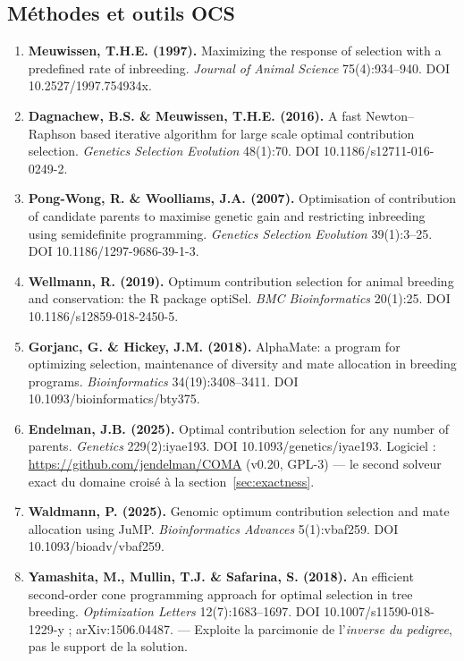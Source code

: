\documentclass[11pt]{article}
\begin{document}
\subsection*{Méthodes et outils OCS}
\begin{enumerate}
\item \textbf{Meuwissen, T.H.E. (1997).} Maximizing the response of selection with a predefined rate of inbreeding. \emph{Journal of Animal Science} 75(4):934--940. DOI 10.2527/1997.754934x.
\item \textbf{Dagnachew, B.S. \& Meuwissen, T.H.E. (2016).} A fast Newton--Raphson based iterative algorithm for large scale optimal contribution selection. \emph{Genetics Selection Evolution} 48(1):70. DOI 10.1186/s12711-016-0249-2.
\item \textbf{Pong-Wong, R. \& Woolliams, J.A. (2007).} Optimisation of contribution of candidate parents to maximise genetic gain and restricting inbreeding using semidefinite programming. \emph{Genetics Selection Evolution} 39(1):3--25. DOI 10.1186/1297-9686-39-1-3.
\item \textbf{Wellmann, R. (2019).} Optimum contribution selection for animal breeding and conservation: the R package optiSel. \emph{BMC Bioinformatics} 20(1):25. DOI 10.1186/s12859-018-2450-5.
\item \textbf{Gorjanc, G. \& Hickey, J.M. (2018).} AlphaMate: a program for optimizing selection, maintenance of diversity and mate allocation in breeding programs. \emph{Bioinformatics} 34(19):3408--3411. DOI 10.1093/bioinformatics/bty375.
\item \textbf{Endelman, J.B. (2025).} Optimal contribution selection for any number of parents. \emph{Genetics} 229(2):iyae193. DOI 10.1093/genetics/iyae193. Logiciel : \url{https://github.com/jendelman/COMA} (v0.20, GPL-3) --- le second solveur exact du domaine croisé à la section~\ref{sec:exactness}.
\item \textbf{Waldmann, P. (2025).} Genomic optimum contribution selection and mate allocation using JuMP. \emph{Bioinformatics Advances} 5(1):vbaf259. DOI 10.1093/bioadv/vbaf259.
\item \textbf{Yamashita, M., Mullin, T.J. \& Safarina, S. (2018).} An efficient second-order cone programming approach for optimal selection in tree breeding. \emph{Optimization Letters} 12(7):1683--1697. DOI 10.1007/s11590-018-1229-y ; arXiv:1506.04487. --- Exploite la parcimonie de l'\emph{inverse du pedigree}, pas le support de la solution.
\end{enumerate}
\end{document}
